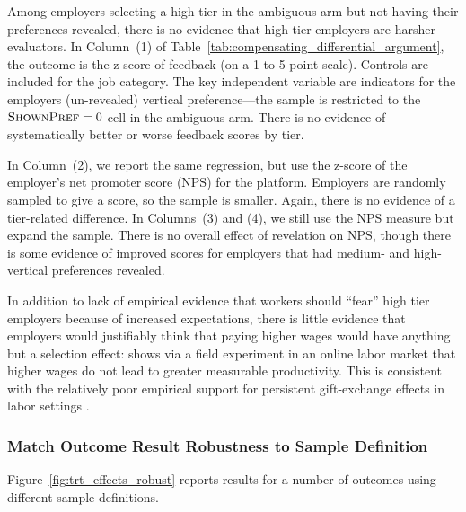 \documentclass[12pt]{article}
\begin{document}
Among employers selecting a high tier in the ambiguous arm but not having their preferences revealed, there is no evidence that high tier employers are harsher evaluators.
In Column~(1) of Table~\ref{tab:compensating_differential_argument}, the outcome is the z-score of feedback (on a 1 to 5 point scale).
Controls are included for the job category.
The key independent variable are indicators for the employers (un-revealed) vertical preference---the sample is restricted to the $\textsc{ShownPref} = 0$ cell in the ambiguous arm.
There is no evidence of systematically better or worse feedback scores by tier.

In Column~(2), we report the same regression, but use the z-score of the employer's net promoter score (NPS) for the platform.
Employers are randomly sampled to give a score, so the sample is smaller.
Again, there is no evidence of a tier-related difference.
In Columns~(3) and (4), we still use the NPS measure but expand the sample.
There is no overall effect of revelation on NPS, though there is some evidence of improved scores for employers that had medium- and high-vertical preferences revealed. 



In addition to lack of empirical evidence that workers should ``fear'' high tier employers because of increased expectations, there is little evidence that employers would justifiably think that paying higher wages would have anything but a selection effect: 
\cite{gilchrist20163} shows via a field experiment in an online labor market that higher wages do not lead to greater measurable productivity.
This is consistent with the relatively poor empirical support for persistent gift-exchange effects in labor settings \citep{gneezy2006putting}. 


\subsubsection{Match Outcome Result Robustness to Sample Definition} \label{online_app:trt_effects_robust}

Figure~\ref{fig:trt_effects_robust} reports results for a number of outcomes using different sample definitions. 
\end{document}
